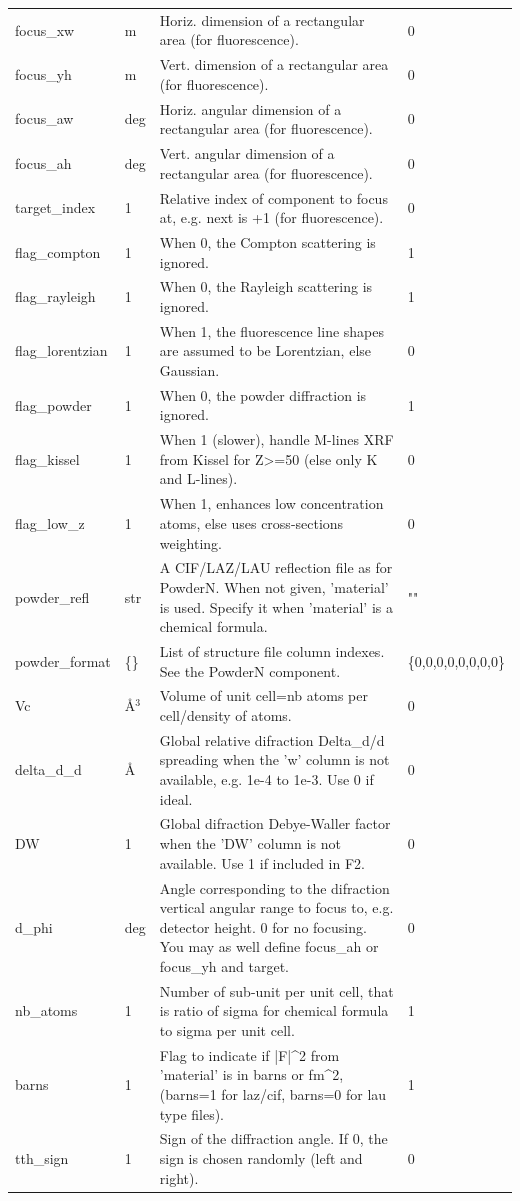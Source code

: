 \begin{longtable}{p{}p{}p{}p{}}
focus\_xw & m & Horiz. dimension of a rectangular area (for fluorescence). & 0 \\
focus\_yh & m & Vert.  dimension of a rectangular area (for fluorescence). & 0 \\
focus\_aw & deg & Horiz. angular dimension of a rectangular area (for fluorescence). & 0 \\
focus\_ah & deg & Vert.  angular dimension of a rectangular area (for fluorescence). & 0 \\
target\_index & 1 & Relative index of component to focus at, e.g. next is +1 (for fluorescence). & 0 \\
flag\_compton & 1 & When 0, the Compton  scattering is ignored. & 1 \\
flag\_rayleigh & 1 & When 0, the Rayleigh scattering is ignored. & 1 \\
flag\_lorentzian & 1 & When 1, the fluorescence line shapes are assumed to be Lorentzian, else Gaussian. & 0 \\
flag\_powder & 1 & When 0, the powder diffraction is ignored. & 1 \\
flag\_kissel & 1 & When 1 (slower), handle M-lines XRF from Kissel for Z\textgreater{}=50 (else only K and L-lines). & 0 \\
flag\_low\_z & 1 & When 1, enhances low concentration atoms, else uses cross-sections weighting. & 0 \\
powder\_refl & str & A CIF/LAZ/LAU reflection file as for PowderN. When not given, 'material' is used. Specify it when 'material' is a chemical formula. & "" \\
powder\_format & \{\} & List of structure file column indexes. See the PowderN component. & \{0,0,0,0,0,0,0,0\} \\
Vc & \AA{}$^{3}$ & Volume of unit cell=nb atoms per cell/density of atoms. & 0 \\
delta\_d\_d & \AA{} & Global relative difraction Delta\_d/d spreading when the 'w' column is not available, e.g. 1e-4 to 1e-3. Use 0 if ideal. & 0 \\
DW & 1 & Global difraction Debye-Waller factor when the 'DW' column is not available. Use 1 if included in F2. & 0 \\
d\_phi & deg & Angle corresponding to the difraction vertical angular range to focus to, e.g. detector height. 0 for no focusing. You may as well define focus\_ah or focus\_yh and target. & 0 \\
nb\_atoms & 1 & Number of sub-unit per unit cell, that is ratio of sigma for chemical formula to sigma per unit cell. & 1 \\
barns & 1 & Flag to indicate if |F|\textasciicircum{}2 from 'material' is in barns or fm\textasciicircum{}2, (barns=1 for laz/cif, barns=0 for lau type files). & 1 \\
tth\_sign & 1 & Sign of the diffraction angle. If 0, the sign is chosen randomly (left and right). & 0 \\
\bottomrule
\end{longtable}


